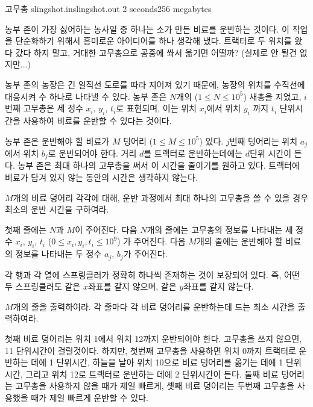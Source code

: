 \begin{problem}{고무총}
	{slingshot.in}{slingshot.out}
	{2 seconds}{256 megabytes}{}
	
	농부 존이 가장 싫어하는 농사일 중 하나는 소가 만든 비료를 운반하는 것이다. 이 작업을 단순화하기 위해서 흥미로운 아이디어를 하나 생각해 냈다. 트랙터로 두 위치를 왔다 갔다 하지 말고, 거대한 고무총으로 공중에 쏴서 옮기면 어떨까? (실제로 안 될건 없지만...)
	
	농부 존의 농장은 긴 일직선 도로를 따라 지어져 있기 때문에, 농장의 위치를 수직선에 대응시켜 수 하나로 나타낼 수 있다. 농부 존은 $N$개의 ($1 \le N \le 10^5$) 새총을 지었고, $i$ 번째 고무총은 세 정수 $x_i$, $y_i$, $t_i$로 표현되며, 이는 위치 $x_i$에서 위치 $y_i$ 까지 $t_i$ 단위시간을 사용하여 비료를 운반할 수 있다는 것이다.
	
	농부 존은 운반해야 할 비료가 $M$ 덩어리 ($1 \le M \le 10^5$) 있다. $j$번째 덩어리는 위치 $a_j$에서 위치 $b_j$로 운반되어야 한다. 거리 $d$를 트랙터로 운반하는데에는 $d$단위 시간이 든다. 농부 존은 최대 하나의 고무총을 써서 이 시간을 줄이기를 원하고 있다. 트랙터에 비료가 담겨 있지 않는 동안의 시간은 생각하지 않는다.
	
	$M$개의 비료 덩어리 각각에 대해, 운반 과정에서 최대 하나의 고무총을 쓸 수 있을 경우 최소의 운반 시간을 구하여라.
	
	
	\InputFile
	
	첫째 줄에는 $N$과 $M$이 주어진다. 다음 $N$개의 줄에는 고무총의 정보를 나타내는 세 정수 $x_i$, $y_i$, $t_i$ ($0 \le x_i, y_i, t_i \le 10^9$) 가 주어진다. 다음 $M$개의 줄에는 운반해야 할 비료의 정보를 나타내는 두 정수 $a_j$, $b_j$가 주어진다.
	
	각 행과 각 열에 스프링클러가 정확히 하나씩 존재하는 것이 보장되어 있다. 즉, 어떤 두 스프링클러도 같은 $x$좌표를 같지 않으며, 같은 $y$좌표를 같지 않는다.

	\OutputFile
	
	$M$개의 줄을 출력하여라. 각 줄마다 각 비료 덩어리를 운반하는데 드는 최소 시간을 출력하여라.
	
	\Examples
		
	\begin{example}
	\end{example}

	\Note 
	
	첫째 비료 덩어리는 위치 1에서 위치 12까지 운반되어야 한다. 고무총을 쓰지 않으면, 11 단위시간이 걸릴것이다. 하지만, 첫번째 고무총을 사용하면 위치 0까지 트랙터로 운반하는 데에 1 단위시간, 하늘을 날아 위치 10으로 비료 덩어리를 옮기는 데에 1 단위시간, 그리고 위치 12로 트랙터로 운반하는 데에 2 단위시간이 든다. 둘째 비료 덩어리는 고무총을 사용하지 않을 때가 제일 빠르게, 셋째 비료 덩어리는 두번째 고무총을 사용했을 때가 제일 빠르게 운반할 수 있다.
	
	
	
\end{problem}


